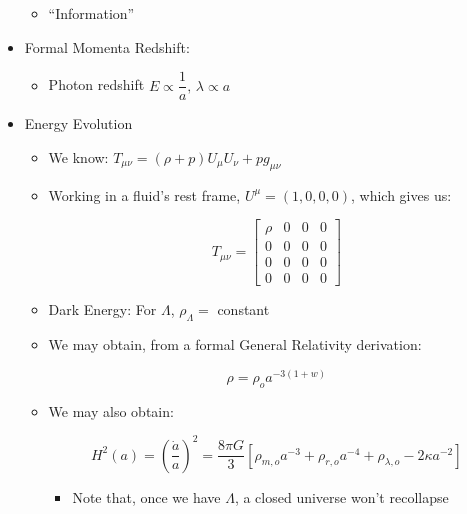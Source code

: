 \begin{itemize}
    \begin{itemize}

      \item ``Information''

    \end{itemize}

  \item Formal Momenta Redshift:

    \begin{itemize}

      \item Photon redshift $E\propto \dfrac{1}{a},\, \lambda\propto a$

    \end{itemize}

  \item Energy Evolution

    \begin{itemize}

      \item We know: $T_{\mu\nu}=(\rho+p)U_{\mu}U_{\nu}+pg_{\mu\nu}$

      \item Working in a fluid's rest frame, $U^{\mu}=(1,0,0,0)$, which gives us:

        $$T_{\mu\nu}=\left[ \begin{matrix}\rho & 0 & 0 & 0\\ 0 & 0 & 0 & 0\\ 0 & 0 & 0 & 0\\ 0 & 0 & 0 & 0 \end{matrix} \right]$$

      \item Dark Energy: For $\Lambda$, $\rho_{\Lambda}=$ constant

      \item We may obtain, from a formal General Relativity derivation:

        $$\rho=\rho_oa^{-3(1+w)}$$

      \item We may also obtain:

        $$H^2(a)=\left( \frac{\dot{a}}{a} \right)^2=\frac{8\pi G}{3}\left[ \rho_{m,o}a^{-3}+\rho_{r,o}a^{-4}+\rho_{\lambda,o}-2\kappa a^{-2} \right]$$

        \begin{itemize}

          \item Note that, once we have $\Lambda$, a closed universe won't recollapse


\end{itemize}
\end{itemize}
\end{itemize}
